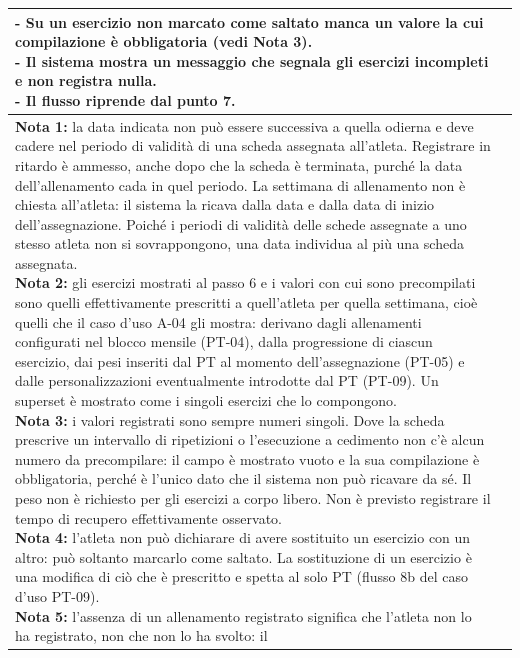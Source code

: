 \documentclass[../../../../SoftwareRequirementsSpecification.tex]{subfiles}
\begin{document}
\begin{tabularx}{\textwidth}{|l|X|}
{    - Su un esercizio non marcato come saltato manca un valore la cui
    compilazione è obbligatoria (vedi Nota 3). \newline
    - Il sistema mostra un messaggio che segnala gli esercizi
    incompleti e non registra nulla. \newline
    - Il flusso riprende dal punto 7.
  } \\ \hline
  \ucnote{
    \textbf{Nota 1:} la data indicata non può essere successiva a
    quella odierna e deve cadere nel periodo di validità di una
    scheda assegnata all'atleta. Registrare in ritardo è ammesso,
    anche dopo che la scheda è terminata, purché la data
    dell'allenamento cada in quel periodo. La settimana di
    allenamento non è chiesta all'atleta: il sistema la ricava dalla
    data e dalla data di inizio dell'assegnazione. Poiché i periodi
    di validità delle schede assegnate a uno stesso atleta non si
    sovrappongono, una data individua al più una scheda
    assegnata.\newline
    \textbf{Nota 2:} gli esercizi mostrati al passo 6 e i valori con
    cui sono precompilati sono quelli effettivamente prescritti a
    quell'atleta per quella settimana, cioè quelli che il caso d'uso
    A-04 gli mostra: derivano dagli allenamenti configurati nel
    blocco mensile (PT-04), dalla progressione di ciascun esercizio,
    dai pesi inseriti dal PT al momento dell'assegnazione (PT-05) e
    dalle personalizzazioni eventualmente introdotte dal PT (PT-09).
    Un superset è mostrato come i singoli esercizi che lo
    compongono.\newline
    \textbf{Nota 3:} i valori registrati sono sempre numeri singoli.
    Dove la scheda prescrive un intervallo di ripetizioni o
    l'esecuzione a cedimento non c'è alcun numero da precompilare: il
    campo è mostrato vuoto e la sua compilazione è obbligatoria,
    perché è l'unico dato che il sistema non può ricavare da sé. Il
    peso non è richiesto per gli esercizi a corpo libero. Non è
    previsto registrare il tempo di recupero effettivamente
    osservato.\newline
    \textbf{Nota 4:} l'atleta non può dichiarare di avere sostituito
    un esercizio con un altro: può soltanto marcarlo come saltato.
    La sostituzione di un esercizio è una modifica di ciò che è
    prescritto e spetta al solo PT (flusso 8b del caso d'uso
    PT-09).\newline
    \textbf{Nota 5:} l'assenza di un allenamento registrato significa
    che l'atleta non lo ha registrato, non che non lo ha svolto: il
}
\end{tabularx}
\end{document}
